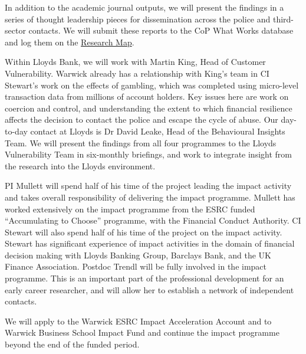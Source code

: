 \documentclass[11pt, a4paper]{article}
\newcommand{\TM}[1] {{\textcolor{orange}{#1}}}
\begin{document}
In addition to the academic journal outputs, we will present the findings in a series of thought leadership pieces for dissemination across the police and third-sector contacts. We will submit these reports to the CoP What Works database and log them on the \href{https://whatworks.college.police.uk/Research/Research-Map/Pages/Research-Map.aspx}{Research Map}.

Within Lloyds Bank, we will work with Martin King, Head of Customer Vulnerability. Warwick already has a relationship with King's team in CI Stewart's work on the effects of gambling, which was completed using micro-level transaction data from millions of account holders. Key issues here are work on coercion and control, and understanding the extent to which financial resilience affects the decision to contact the police and escape the cycle of abuse. Our day-to-day contact at Lloyds is Dr David Leake, Head of the Behavioural Insights Team. We will present the findings from all four programmes to the Lloyds Vulnerability Team in six-monthly briefings, and work to integrate insight from the research into the Lloyds environment. 









PI Mullett will spend half of his time of the project leading the impact activity and takes overall responsibility of delivering the impact programme. Mullett has worked extensively on the impact programme from the ESRC funded ``Accumulating to Choose'' programme, with the Financial Conduct Authority. CI Stewart will also spend half of his time of the project on the impact activity. Stewart has significant experience of impact activities in the domain of financial decision making with Lloyds Banking Group, Barclays Bank, and the UK Finance Association. Postdoc Trendl will be fully involved in the impact programme. This is an important part of the professional development for an early career researcher, and will allow her to establish a network of independent contacts. 

We will apply to the Warwick ESRC Impact Acceleration Account and to Warwick Business School Impact Fund and continue the impact programme beyond the end of the funded period. 
\end{document}
